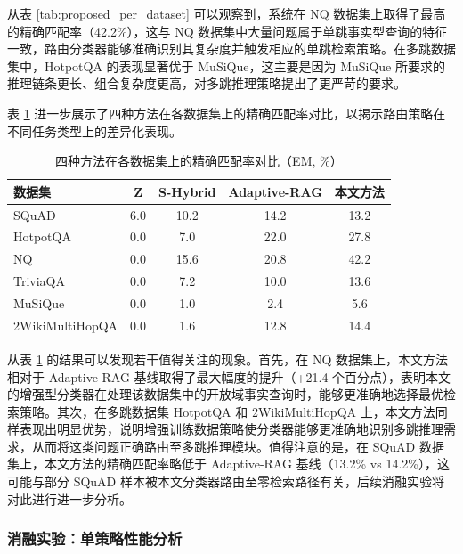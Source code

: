 从表 \ref{tab:proposed_per_dataset} 可以观察到，系统在 NQ 数据集上取得了最高的精确匹配率（42.2\%），这与 NQ 数据集中大量问题属于单跳事实型查询的特征一致，路由分类器能够准确识别其复杂度并触发相应的单跳检索策略。在多跳数据集中，HotpotQA 的表现显著优于 MuSiQue，这主要是因为 MuSiQue 所要求的推理链条更长、组合复杂度更高，对多跳推理策略提出了更严苛的要求。


表 \ref{tab:per_dataset_em_comparison} 进一步展示了四种方法在各数据集上的精确匹配率对比，以揭示路由策略在不同任务类型上的差异化表现。

\begin{table}[htbp]
    \centering
    \caption{四种方法在各数据集上的精确匹配率对比（EM, \%）}
    \label{tab:per_dataset_em_comparison}
    \renewcommand{\arraystretch}{1.3}
    \begin{tabular}{l c c c c}
        \toprule
        \textbf{数据集} & \textbf{Z} & \textbf{S-Hybrid} & \textbf{Adaptive-RAG} & \textbf{本文方法} \\
        \midrule
        SQuAD & 6.0 & 10.2 & 14.2 & 13.2 \\
        HotpotQA & 0.0 & 7.0 & 22.0 & 27.8 \\
        NQ & 0.0 & 15.6 & 20.8 & 42.2 \\
        TriviaQA & 0.0 & 7.2 & 10.0 & 13.6 \\
        MuSiQue & 0.0 & 1.0 & 2.4 & 5.6 \\
        2WikiMultiHopQA & 0.0 & 1.6 & 12.8 & 14.4 \\
        \bottomrule
    \end{tabular}
\end{table}

从表 \ref{tab:per_dataset_em_comparison} 的结果可以发现若干值得关注的现象。首先，在 NQ 数据集上，本文方法相对于 Adaptive-RAG 基线取得了最大幅度的提升（+21.4 个百分点），表明本文的增强型分类器在处理该数据集中的开放域事实查询时，能够更准确地选择最优检索策略。其次，在多跳数据集 HotpotQA 和 2WikiMultiHopQA 上，本文方法同样表现出明显优势，说明增强训练数据策略使分类器能够更准确地识别多跳推理需求，从而将这类问题正确路由至多跳推理模块。值得注意的是，在 SQuAD 数据集上，本文方法的精确匹配率略低于 Adaptive-RAG 基线（13.2\% vs 14.2\%），这可能与部分 SQuAD 样本被本文分类器路由至零检索路径有关，后续消融实验将对此进行进一步分析。

\subsubsection{消融实验：单策略性能分析}

